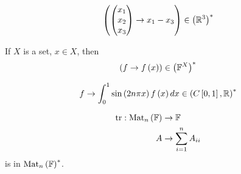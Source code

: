 \documentclass[a4paper]{article}
\begin{document}
\begin{eg}
\begin{equation*}
\begin{aligned}
\left(\left(\begin{matrix}
x_1\\
x_2\\
x_3
\end{matrix}\right) \to x_1 - x_3\right) \in \left(\mathbb{R}^3\right)^*
\end{aligned}
\end{equation*}
\end{eg}

\begin{eg}
If $X$ is a set, $x \in X$, then 
\begin{equation*}
\begin{aligned}
\left(f \to f\left(x\right) \right) \in \left(\mathbb{F}^X\right)^*
\end{aligned}
\end{equation*}
\end{eg}

\begin{eg}
$$f\to \int_0^1 \sin\left(2n\pi x\right) f\left(x\right) dx \in \left(C\left[0,1\right],\mathbb{R}\right)^*$$
\end{eg}

\begin{eg}
\begin{equation*}
\begin{aligned}
\operatorname{tr}: \operatorname{Mat}_n\left(\mathbb{F}\right) &\to \mathbb{F}\\
A &\to \sum_{i=1}^n A_{ii}
\end{aligned}
\end{equation*}
is in $\operatorname{Mat}_n\left(\mathbb{F}\right)^*$.
\end{eg}
\end{document}
